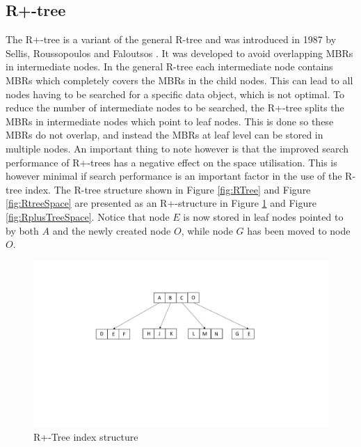 \subsection{R+-tree}
The R+-tree is a variant of the general R-tree and was introduced in 1987 by Sellis, Roussopoulos and Faloutsos \cite{R+Tree}. It was developed to avoid overlapping MBRs in intermediate nodes. In the general R-tree each intermediate node contains MBRs which completely covers the MBRs in the child nodes. This can lead to all nodes having to be searched for a specific data object, which is not optimal. To reduce the number of intermediate nodes to be searched, the R+-tree splits the MBRs in intermediate nodes which point to leaf nodes. This is done so these MBRs do not overlap, and instead the MBRs at leaf level can be stored in multiple nodes. An important thing to note however is that the improved search performance of R+-trees has a negative effect on the space utilisation. This is however minimal if search performance is an important factor in the use of the R-tree index. The R-tree structure shown in Figure \ref{fig:RTree} and Figure \ref{fig:RtreeSpace} are presented as an R+-structure in Figure \ref{fig:RplusTree} and Figure \ref{fig:RplusTreeSpace}. Notice that node $E$ is now stored in leaf nodes pointed to by both $A$ and the newly created node $O$, while node $G$ has been moved to node $O$. 

\begin{figure}[ht]
    \centering
    \includegraphics[scale=0.4]{figures/RPlusTree.pdf}
    \caption{R+-Tree index structure}
    \label{fig:RplusTree}
\end{figure}

